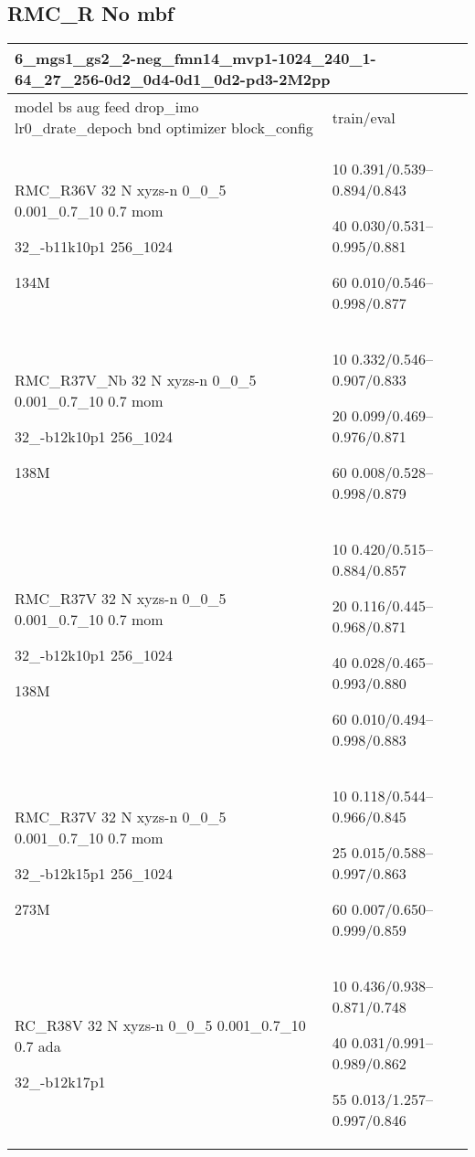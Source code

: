 \documentclass[,table,dvipsnames]{article}
\begin{document}
\subsection{RMC\_R No mbf}
\noindent\begin{tabular}{|p{10cm}|p{5cm}| }	
	\hline
	\multicolumn{2}{|p{15cm}|}{ 6\_mgs1\_gs2\_2-neg\_fmn14\_mvp1-1024\_240\_1-64\_27\_256-0d2\_0d4-0d1\_0d2-pd3-2M2pp}\\
	\hline
	model bs aug feed drop\_imo lr0\_drate\_depoch bnd optimizer block\_config & train/eval \\
	
	\rowcolor{red!20}
	RMC\_R36V 32 N xyzs-n 0\_0\_5 0.001\_0.7\_10 0.7 mom\par 32\_-b11k10p1 256\_1024\par 134M& 10 0.391/0.539--0.894/0.843\par 40 0.030/0.531--0.995/0.881\par 60 0.010/0.546--0.998/0.877\\
		
	\rowcolor{blue!20}
	RMC\_R37V\_Nb 32 N xyzs-n 0\_0\_5 0.001\_0.7\_10 0.7 mom\par 32\_-b12k10p1 256\_1024\par 138M&  10 0.332/0.546--0.907/0.833\par 20 0.099/0.469--0.976/0.871\par 60 0.008/0.528--0.998/0.879\\
	
	\rowcolor{green!20}
	RMC\_R37V 32 N xyzs-n 0\_0\_5 0.001\_0.7\_10 0.7 mom\par  32\_-b12k10p1 256\_1024\par 138M& 10 0.420/0.515--0.884/0.857\par 20 0.116/0.445--0.968/0.871\par 40 0.028/0.465--0.993/0.880\par 60 0.010/0.494--0.998/0.883\\
	
	\rowcolor{yellow!20}
	RMC\_R37V 32 N xyzs-n 0\_0\_5 0.001\_0.7\_10 0.7 mom \par 32\_-b12k15p1 256\_1024\par 273M& 10 0.118/0.544--0.966/0.845\par 25 0.015/0.588--0.997/0.863\par 60 0.007/0.650--0.999/0.859\\
	
	\rowcolor{green!20}
	RC\_R38V 32 N xyzs-n 0\_0\_5 0.001\_0.7\_10 0.7 ada \par 32\_-b12k17p1& 10 0.436/0.938--0.871/0.748\par 40 0.031/0.991--0.989/0.862\par 55 0.013/1.257--0.997/0.846\\
	

\end{tabular}
\end{document}
